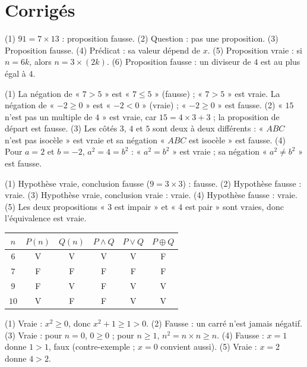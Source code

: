 \section{Corrigés}
\begin{solution}
(1) $91=7\times13$ : proposition fausse. (2) Question : pas une proposition. (3) Proposition fausse. (4) Prédicat : sa valeur dépend de $x$. (5) Proposition vraie : si $n=6k$, alors $n=3\times(2k)$. (6) Proposition fausse : un diviseur de $4$ est au plus égal à $4$.
\end{solution}
\begin{solution}
(1) La négation de « $7>5$ » est « $7\le5$ » (fausse) ; « $7>5$ » est vraie. La négation de « $-2\ge0$ » est « $-2<0$ » (vraie) ; « $-2\ge0$ » est fausse. (2) « $15$ n'est pas un multiple de $4$ » est vraie, car $15=4\times3+3$ ; la proposition de départ est fausse. (3) Les côtés $3$, $4$ et $5$ sont deux à deux différents : « $ABC$ n'est pas isocèle » est vraie et sa négation « $ABC$ est isocèle » est fausse. (4) Pour $a=2$ et $b=-2$, $a^2=4=b^2$ : « $a^2=b^2$ » est vraie ; sa négation « $a^2\ne b^2$ » est fausse.
\end{solution}
\begin{solution}
(1) Hypothèse vraie, conclusion fausse ($9=3\times3$) : fausse. (2) Hypothèse fausse : vraie. (3) Hypothèse vraie, conclusion vraie : vraie. (4) Hypothèse fausse : vraie. (5) Les deux propositions « $3$ est impair » et « $4$ est pair » sont vraies, donc l'équivalence est vraie.
\end{solution}
\begin{solution}
\begin{center}
\begin{tabular}{c|c|c|c|c|c}
$n$ & $P(n)$ & $Q(n)$ & $P\land Q$ & $P\lor Q$ & $P\oplus Q$\\\hline
$6$ & V & V & V & V & F\\
$7$ & F & F & F & F & F\\
$9$ & F & V & F & V & V\\
$10$ & V & F & F & V & V
\end{tabular}
\end{center}
\end{solution}
\begin{solution}
(1) Vraie : $x^2\ge0$, donc $x^2+1\ge1>0$. (2) Fausse : un carré n'est jamais négatif. (3) Vraie : pour $n=0$, $0\ge0$ ; pour $n\ge1$, $n^2=n\times n\ge n$. (4) Fausse : $x=1$ donne $1>1$, faux (contre-exemple ; $x=0$ convient aussi). (5) Vraie : $x=2$ donne $4>2$.
\end{solution}
